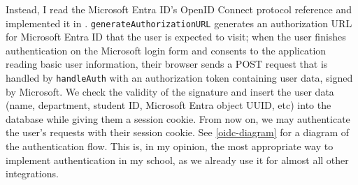 Instead, I read the Microsoft Entra ID's OpenID Connect protocol reference \parencite{ms-oidc} and implemented it in . \texttt{generateAuthorizationURL} generates an authorization URL for Microsoft Entra ID that the user is expected to visit; when the user finishes authentication on the Microsoft login form and consents to the application reading basic user information, their browser sends a POST request that is handled by \texttt{handleAuth} with an authorization token containing user data, signed by Microsoft. We check the validity of the signature and insert the user data (name, department, student ID, Microsoft Entra object UUID, etc) into the database while giving them a session cookie. From now on, we may authenticate the user's requests with their session cookie. See \autoref{oidc-diagram} for a diagram of the authentication flow. This is, in my opinion, the most appropriate way to implement authentication in my school, as we already use it for almost all other integrations.

